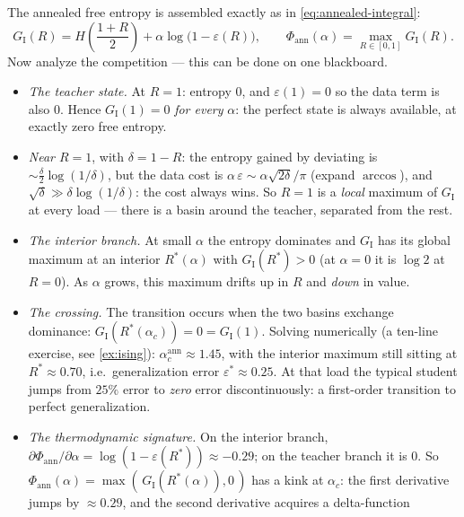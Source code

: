 \documentclass[11pt]{article}
\begin{document}
The annealed free entropy is assembled exactly as in
\cref{eq:annealed-integral}:
\begin{equation}
  \label{eq:ising-G}
  G_{\mathrm{I}}(R) = H\!\left(\frac{1+R}{2}\right)
  + \alpha \log\bigl(1 - \varepsilon(R)\bigr),
  \qquad
  \Phi_{\mathrm{ann}}(\alpha) = \max_{R \in [0,1]} G_{\mathrm{I}}(R).
\end{equation}
Now analyze the competition --- this can be done on one blackboard.
\begin{itemize}
  \item \emph{The teacher state.} At $R = 1$: entropy $0$, and
  $\varepsilon(1) = 0$ so the data term is also $0$. Hence
  $G_{\mathrm{I}}(1) = 0$ \emph{for every} $\alpha$: the perfect state is
  always available, at exactly zero free entropy.
  \item \emph{Near $R = 1$}, with $\delta = 1 - R$: the entropy gained by
  deviating is $\sim \tfrac{\delta}{2}\log(1/\delta)$, but the data cost is
  $\alpha\,\varepsilon \sim \alpha\sqrt{2\delta}/\pi$ (expand $\arccos$),
  and $\sqrt{\delta} \gg \delta\log(1/\delta)$: the cost always wins.
  So $R = 1$ is a \emph{local} maximum of $G_{\mathrm{I}}$ at every load
  --- there is a basin around the teacher, separated from the rest.
  \item \emph{The interior branch.} At small $\alpha$ the entropy dominates
  and $G_{\mathrm{I}}$ has its global maximum at an interior $R^*(\alpha)$
  with $G_{\mathrm{I}}(R^*) > 0$ (at $\alpha = 0$ it is $\log 2$ at
  $R = 0$). As $\alpha$ grows, this maximum drifts up in $R$ and
  \emph{down} in value.
  \item \emph{The crossing.} The transition occurs when the two basins
  exchange dominance: $G_{\mathrm{I}}(R^*(\alpha_c)) = 0 =
  G_{\mathrm{I}}(1)$. Solving numerically (a ten-line exercise, see
  \cref{ex:ising}): $\alpha_c^{\mathrm{ann}} \approx 1.45$, with the
  interior maximum still sitting at $R^* \approx 0.70$, i.e.\
  generalization error $\varepsilon^* \approx 0.25$. At that load the
  typical student jumps from $25\%$ error to \emph{zero} error
  discontinuously: a first-order transition to perfect generalization.
  \item \emph{The thermodynamic signature.} On the interior branch,
  $\partial\Phi_{\mathrm{ann}}/\partial\alpha =
  \log(1 - \varepsilon(R^*)) \approx -0.29$; on the teacher branch it is
  $0$. So $\Phi_{\mathrm{ann}}(\alpha) = \max(\,G_{\mathrm{I}}(R^*(\alpha)),
  0\,)$ has a kink at $\alpha_c$: the first derivative jumps by
  $\approx 0.29$, and the second derivative acquires a delta-function

\end{itemize}
\end{document}
